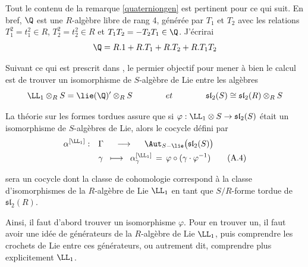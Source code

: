 \begin{annexeRem} Tout le contenu de la remarque \ref{quaterniongen} est pertinent pour ce qui suit. En bref, $\Q$ est une $R$-alg\`ebre libre de rang 4, générée par $T_1$ et $T_2$ avec les relations $T_1^2 = t_1^2 \in R$, $T_2^2 = t_2^2 \in R$ et $T_1T_2 = -T_2T_1 \in \Q$. J'écrirai 
$$ \Q = R.1+R.T_1+R.T_2+R.T_1T_2 $$
\end{annexeRem}

\begin{annexeRem} Suivant ce qui est prescrit dans \cite{Bgalois}, le permier objectif pour mener à bien le calcul est de trouver un isomorphisme de $S$-algèbre de Lie entre les algèbres 
$$ \LL_1 \otimes_R S = \lie(\Q)'  \otimes_R S \qquad \qquad et \qquad \qquad \mathfrak{sl}_2(S) \cong \mathfrak{sl}_2(R) \otimes_R S $$ 

La théorie sur les formes tordues assure que si $\varphi : \LL_1 \otimes S \rightarrow \mathfrak{sl}_2(S)$ était un isomorphisme de $S$-algèbres de Lie, alors le cocycle défini par 
\begin{align} 
\alpha^{[\LL_1]} : \quad &\Gamma \;\;\;\;\; \longrightarrow \;\;\;\;\; \Aut_{S-\lie}\big(\mathfrak{sl}_2(S)\big) \notag \\ 
&\gamma \;\; \longmapsto \;\; \alpha_\gamma^{[\LL_1]} \, = \, \varphi \circ (\gamma \cdot \varphi^{-1}) \tag{A.4}
\end{align}
\addtocounter{laid}{1}
sera un cocycle dont la classe de cohomologie correspond à la classe d'isomorphismes de la $R$-algèbre de Lie $\LL_1$ en tant que $S/R$-forme tordue de $\mathfrak{sl}_2(R)$.
\end{annexeRem}

Ainsi, il faut d'abord trouver un isomorphisme $\varphi$. Pour en trouver un, il faut avoir une idée de générateurs de la $R$-algèbre de Lie $\LL_1$, puis comprendre les crochets de Lie entre ces générateurs, ou autrement dit, comprendre plus explicitement $\LL_1$.


